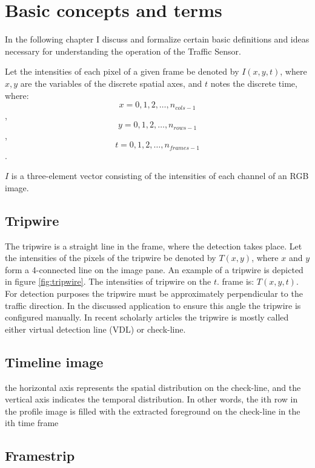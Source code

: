 \chapter{Basic concepts and terms}\label{chap:Concepts}
In the following chapter I discuss and formalize certain basic definitions and ideas necessary for understanding the operation of the Traffic Sensor.

Let the intensities of each pixel of a given frame be denoted by $I(x,y,t)$, where $x, y$ are the variables of the discrete spatial axes, and $t$ notes the discrete time, where:
\begin{displaymath}
x=0,1,2,\dotsc,n_{cols-1}
\end{displaymath} 
,
\begin{displaymath}
y=0,1,2,\dotsc,n_{rows-1}
\end{displaymath}
,
\begin{displaymath}
t=0,1,2,\dotsc,n_{frames-1}
\end{displaymath}.

$I$ is a three-element vector consisting of the intensities of each channel of an RGB image.

\section{Tripwire}
The tripwire is a straight line in the frame, where the detection takes place.
Let the intensities of the pixels of the tripwire be denoted by $T(x,y)$, where $x$ and $y$ form a 4-connected line on the image pane.
An example of a tripwire is depicted in figure \ref{fig:tripwire}.
The intensities of tripwire on the $t$. frame is: $T(x,y,t)$.
For detection purposes the tripwire must be approximately perpendicular to the traffic direction.
In the discussed application to ensure this angle the tripwire is configured manually.
In recent scholarly articles the tripwire is mostly called either virtual detection line (VDL) or check-line.
\section{Timeline image}
the horizontal axis represents the spatial
distribution on the check-line, and the vertical axis indicates
the temporal distribution. In other words, the ith row in the
profile image is filled with the extracted foreground on the
check-line in the ith time frame
\section{Framestrip}

